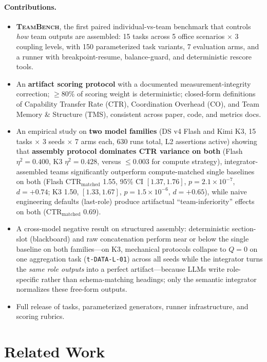 \documentclass{article}
\newcommand{\teambench}{\textsc{TeamBench}}
\newcommand{\ctrm}{\mathrm{CTR}_{\text{matched}}}
\newcommand{\code}[1]{\texttt{#1}}
\begin{document}
\paragraph{Contributions.}
\begin{itemize}
\item \textbf{\teambench{}}, the first paired individual-vs-team benchmark that controls \emph{how} team outputs are assembled: 15 tasks across 5 office scenarios $\times$ 3 coupling levels, with 150 parameterized task variants, 7 evaluation arms, and a runner with breakpoint-resume, balance-guard, and deterministic rescore tools.
\item An \textbf{artifact scoring protocol} with a documented measurement-integrity correction; $\ge$80\% of scoring weight is deterministic; closed-form definitions of Capability Transfer Rate (CTR), Coordination Overhead (CO), and Team Memory \& Structure (TMS), consistent across paper, code, and metrics docs.
\item An empirical study on \textbf{two model families} (DS v4 Flash and Kimi K3, 15 tasks $\times$ 3 seeds $\times$ 7 arms each, 630 runs total, L2 assertions active) showing that \textbf{assembly protocol dominates CTR variance on both} (Flash $\eta^2 = 0.400$, K3 $\eta^2 = 0.428$, versus $\le$0.003 for compute strategy), integrator-assembled teams significantly outperform compute-matched single baselines on both (Flash $\ctrm$ 1.55, 95\% CI $[1.37,1.76]$, $p=2.1\times10^{-7}$, $d=+0.74$; K3 1.50, $[1.33,1.67]$, $p=1.5\times10^{-6}$, $d=+0.65$), while naive engineering defaults (last-role) produce artifactual ``team-inferiority'' effects on both ($\ctrm$ 0.69).
\item A cross-model negative result on structured assembly: deterministic section-slot (blackboard) and raw concatenation perform near or below the single baseline on both families---on K3, mechanical protocols collapse to $Q=0$ on one aggregation task (\code{t-DATA-L-01}) across all seeds while the integrator turns the \emph{same role outputs} into a perfect artifact---because LLMs write role-specific rather than schema-matching headings; only the semantic integrator normalizes these free-form outputs.
\item Full release of tasks, parameterized generators, runner infrastructure, and scoring rubrics.
\end{itemize}

\section{Related Work}
\label{sec:related}
\end{document}
